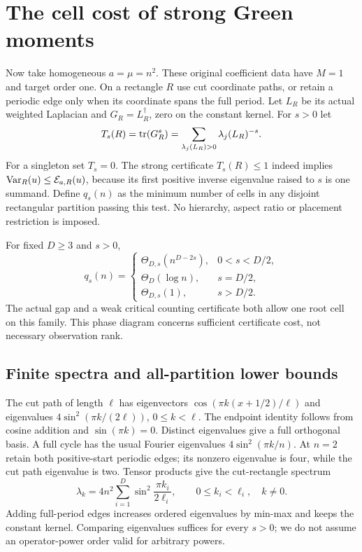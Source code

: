 \section{The cell cost of strong Green moments}
Now take homogeneous $a=\mu=n^2$. These original coefficient data have
$M=1$ and target order one. On a rectangle $R$ use cut coordinate paths,
or retain a periodic edge only when its coordinate spans the full period.
Let $L_R$ be its actual weighted Laplacian and $G_R=L_R^\dagger$, zero
on the constant kernel. For $s>0$ let
\[
 T_s(R)=\operatorname{tr}(G_R^s)=\sum_{\lambda_j(L_R)>0}\lambda_j(L_R)^{-s}.
\]
For a singleton set $T_s=0$. The strong certificate $T_s(R)\le1$ indeed
implies $\operatorname{Var}_R(u)\le\mathcal E_{a,R}(u)$, because its first positive inverse
eigenvalue raised to $s$ is one summand. Define $q_s(n)$ as the minimum
number of cells in any disjoint rectangular partition passing this test.
No hierarchy, aspect ratio or placement restriction is imposed.

\begin{theorem}\label{lg:thm:green}
For fixed $D\ge3$ and $s>0$,
\[
 q_s(n)=
 \begin{cases}
 \Theta_{D,s}(n^{D-2s}),&0<s<D/2,\\
 \Theta_D(\log n),&s=D/2,\\
 \Theta_{D,s}(1),&s>D/2.
 \end{cases}
\]
The actual gap and a weak critical counting certificate both allow one
root cell on this family. This phase diagram concerns sufficient
certificate cost, not necessary observation rank.
\end{theorem}

\subsection{Finite spectra and all-partition lower bounds}
The cut path of length $\ell$ has eigenvectors
$\cos(\pi k(x+1/2)/\ell)$ and eigenvalues
$4\sin^2(\pi k/(2\ell))$, $0\le k<\ell$. The endpoint identity follows
from cosine addition and $\sin(\pi k)=0$. Distinct eigenvalues give a full
orthogonal basis. A full cycle has the usual Fourier eigenvalues
$4\sin^2(\pi k/n)$. At $n=2$ retain both positive-start periodic edges;
its nonzero eigenvalue is four, while the cut path eigenvalue is two.
Tensor products give the cut-rectangle spectrum
\begin{equation}\label{lg:eq:spectrum}
 \lambda_k=4n^2\sum_{i=1}^D\sin^2\frac{\pi k_i}{2\ell_i},
 \qquad 0\le k_i<\ell_i,\quad k\ne0.
\end{equation}
Adding full-period edges increases ordered eigenvalues by min-max and keeps
the constant kernel. Comparing eigenvalues suffices for every $s>0$;
we do not assume an operator-power order valid for arbitrary powers.

